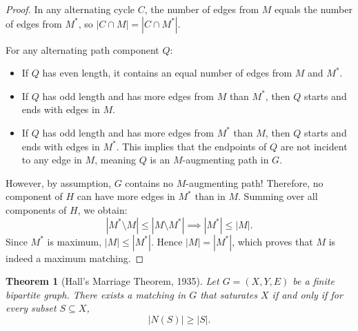 \documentclass[11pt,a4paper]{article}
\newtheorem{theorem}{Theorem}
\begin{document}
\begin{proof}
In any alternating cycle $C$, the number of edges from $M$ equals the number of edges from $M^*$, so $|C \cap M| = |C \cap M^*|$. 

For any alternating path component $Q$:
\begin{itemize}
  \item If $Q$ has even length, it contains an equal number of edges from $M$ and $M^*$.
  \item If $Q$ has odd length and has more edges from $M$ than $M^*$, then $Q$ starts and ends with edges in $M$.
  \item If $Q$ has odd length and has more edges from $M^*$ than $M$, then $Q$ starts and ends with edges in $M^*$. This implies that the endpoints of $Q$ are not incident to any edge in $M$, meaning $Q$ is an $M$-augmenting path in $G$.
\end{itemize}

However, by assumption, $G$ contains no $M$-augmenting path! Therefore, no component of $H$ can have more edges in $M^*$ than in $M$. Summing over all components of $H$, we obtain:
\[
  |M^* \setminus M| \le |M \setminus M^*| \implies |M^*| \le |M|.
\]
Since $M^*$ is maximum, $|M| \le |M^*|$. Hence $|M| = |M^*|$, which proves that $M$ is indeed a maximum matching.
\end{proof}

\begin{theorem}[Hall's Marriage Theorem, 1935]
Let $G = (X, Y, E)$ be a finite bipartite graph. There exists a matching in $G$ that saturates $X$ if and only if for every subset $S \subseteq X$,
\[
  |N(S)| \ge |S|.
\]
\end{theorem}
\end{document}
